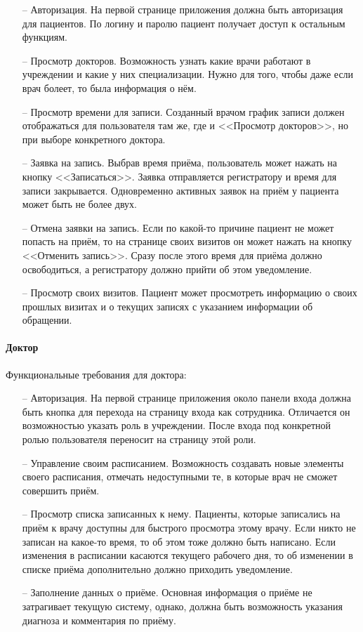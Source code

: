 \documentclass[a4paper,article]{article}
\begin{document}
\begin{sloppypar}
    \begin{itemize}[nolistsep]
        \item[--] Авторизация. На первой странице приложения должна быть авторизация для пациентов. По логину и паролю пациент получает доступ к остальным функциям.
        \item[--] Просмотр докторов. Возможность узнать какие врачи работают в учреждении и какие у них специализации. Нужно для того, чтобы даже если врач болеет, то была информация о нём.
        \item[--] Просмотр времени для записи. Созданный врачом график записи должен отображаться для пользователя там же, где и <<Просмотр докторов>>, но при выборе конкретного доктора.
        \item[--] Заявка на запись. Выбрав время приёма, пользователь может нажать на кнопку <<Записаться>>. Заявка отправляется регистратору и время для записи закрывается. Одновременно активных заявок на приём у пациента может быть не более двух.
        \item[--] Отмена заявки на запись. Если по какой-то причине пациент не может попасть на приём, то на странице своих визитов он может нажать на кнопку <<Отменить запись>>. Сразу после этого время для приёма должно освободиться, а регистратору должно прийти об этом уведомление.
        \item[--] Просмотр своих визитов. Пациент может просмотреть информацию о своих прошлых визитах и о текущих записях с указанием информации об обращении.
    \end{itemize}

    \paragraph{Доктор}\label{ТЗ. Доктор}

    Функциональные требования для доктора:
        \begin{itemize}[nolistsep]
            \item[--] Авторизация. На первой странице приложения около панели входа должна быть кнопка для перехода на страницу входа как сотрудника. Отличается он возможностью указать роль в учреждении. После входа под конкретной ролью пользователя переносит на страницу этой роли.
            \item[--] Управление своим расписанием. Возможность создавать новые элементы своего расписания, отмечать недоступными те, в которые врач не сможет совершить приём.
            \item[--] Просмотр списка записанных к нему. Пациенты, которые записались на приём к врачу доступны для быстрого просмотра этому врачу. Если никто не записан на какое-то время, то об этом тоже должно быть написано. Если изменения в расписании касаются текущего рабочего дня, то об изменении в списке приёма дополнительно должно приходить уведомление.
            \item[--] Заполнение данных о приёме. Основная информация о приёме не затрагивает текущую систему, однако, должна быть возможность указания диагноза и комментария по приёму.
        \end{itemize}
        

\end{sloppypar}
\end{document}
